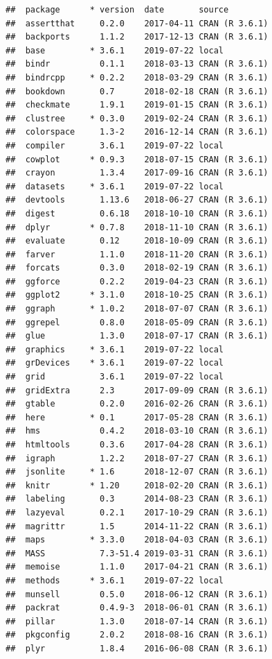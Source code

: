 \documentclass[11pt,a4paper,titlepage,twoside,openright]{style/unimelbthesis}
\theoremstyle{definition}
\theoremstyle{definition}
\theoremstyle{definition}
\theoremstyle{remark}
\begin{document}
\begin{mainmatter}
\begin{verbatim}
##  package      * version  date       source        
##  assertthat     0.2.0    2017-04-11 CRAN (R 3.6.1)
##  backports      1.1.2    2017-12-13 CRAN (R 3.6.1)
##  base         * 3.6.1    2019-07-22 local         
##  bindr          0.1.1    2018-03-13 CRAN (R 3.6.1)
##  bindrcpp     * 0.2.2    2018-03-29 CRAN (R 3.6.1)
##  bookdown       0.7      2018-02-18 CRAN (R 3.6.1)
##  checkmate      1.9.1    2019-01-15 CRAN (R 3.6.1)
##  clustree     * 0.3.0    2019-02-24 CRAN (R 3.6.1)
##  colorspace     1.3-2    2016-12-14 CRAN (R 3.6.1)
##  compiler       3.6.1    2019-07-22 local         
##  cowplot      * 0.9.3    2018-07-15 CRAN (R 3.6.1)
##  crayon         1.3.4    2017-09-16 CRAN (R 3.6.1)
##  datasets     * 3.6.1    2019-07-22 local         
##  devtools       1.13.6   2018-06-27 CRAN (R 3.6.1)
##  digest         0.6.18   2018-10-10 CRAN (R 3.6.1)
##  dplyr        * 0.7.8    2018-11-10 CRAN (R 3.6.1)
##  evaluate       0.12     2018-10-09 CRAN (R 3.6.1)
##  farver         1.1.0    2018-11-20 CRAN (R 3.6.1)
##  forcats        0.3.0    2018-02-19 CRAN (R 3.6.1)
##  ggforce        0.2.2    2019-04-23 CRAN (R 3.6.1)
##  ggplot2      * 3.1.0    2018-10-25 CRAN (R 3.6.1)
##  ggraph       * 1.0.2    2018-07-07 CRAN (R 3.6.1)
##  ggrepel        0.8.0    2018-05-09 CRAN (R 3.6.1)
##  glue           1.3.0    2018-07-17 CRAN (R 3.6.1)
##  graphics     * 3.6.1    2019-07-22 local         
##  grDevices    * 3.6.1    2019-07-22 local         
##  grid           3.6.1    2019-07-22 local         
##  gridExtra      2.3      2017-09-09 CRAN (R 3.6.1)
##  gtable         0.2.0    2016-02-26 CRAN (R 3.6.1)
##  here         * 0.1      2017-05-28 CRAN (R 3.6.1)
##  hms            0.4.2    2018-03-10 CRAN (R 3.6.1)
##  htmltools      0.3.6    2017-04-28 CRAN (R 3.6.1)
##  igraph         1.2.2    2018-07-27 CRAN (R 3.6.1)
##  jsonlite     * 1.6      2018-12-07 CRAN (R 3.6.1)
##  knitr        * 1.20     2018-02-20 CRAN (R 3.6.1)
##  labeling       0.3      2014-08-23 CRAN (R 3.6.1)
##  lazyeval       0.2.1    2017-10-29 CRAN (R 3.6.1)
##  magrittr       1.5      2014-11-22 CRAN (R 3.6.1)
##  maps         * 3.3.0    2018-04-03 CRAN (R 3.6.1)
##  MASS           7.3-51.4 2019-03-31 CRAN (R 3.6.1)
##  memoise        1.1.0    2017-04-21 CRAN (R 3.6.1)
##  methods      * 3.6.1    2019-07-22 local         
##  munsell        0.5.0    2018-06-12 CRAN (R 3.6.1)
##  packrat        0.4.9-3  2018-06-01 CRAN (R 3.6.1)
##  pillar         1.3.0    2018-07-14 CRAN (R 3.6.1)
##  pkgconfig      2.0.2    2018-08-16 CRAN (R 3.6.1)
##  plyr           1.8.4    2016-06-08 CRAN (R 3.6.1)

\end{verbatim}
\end{mainmatter}
\end{document}
